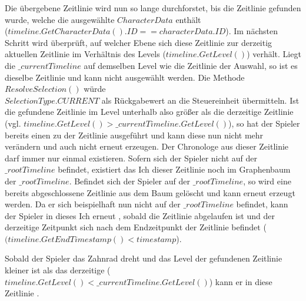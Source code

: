 Die übergebene Zeitlinie wird nun so lange durchforstet, bis die Zeitlinie gefunden wurde, welche die ausgewählte $CharacterData$ enthält 
 \\($timeline.GetCharacterData().ID == characterData.ID$). Im nächsten Schritt wird überprüft, auf welcher Ebene sich diese Zeitlinie zur derzeitig aktuellen Zeitlinie im Verhältnis des Levels ($timeline.GetLevel()$) verhält. Liegt die $\_currentTimeline$ auf demselben Level wie die Zeitlinie der Auswahl, so ist es dieselbe Zeitlinie und kann nicht ausgewählt werden. Die Methode $ResolveSelection()$ würde \\$SelectionType.CURRENT$ als Rückgabewert an die Steuereinheit übermitteln. Ist die gefundene Zeitlinie im Level unterhalb also größer als die derzeitige Zeitlinie (vgl. $timeline.GetLevel() > \_currentTimeline.GetLevel()$), so hat der Spieler bereits einen  zu der Zeitlinie ausgeführt und kann diese nun nicht mehr verändern und auch nicht erneut erzeugen. Der Chronologe aus dieser Zeitlinie darf immer nur einmal existieren. Sofern sich der Spieler nicht auf der $\_rootTimeline$ befindet, existiert das Ich dieser Zeitlinie noch im Graphenbaum der $\_rootTimeline$. Befindet sich der Spieler auf der $\_rootTimeline$, so wird eine bereits abgeschlossene Zeitlinie aus dem Baum gelöscht und kann erneut erzeugt werden. Da er sich beispielhaft nun nicht auf der $\_rootTimeline$ befindet, kann der Spieler in dieses Ich erneut , sobald die Zeitlinie abgelaufen ist und der derzeitige Zeitpunkt sich nach dem Endzeitpunkt der Zeitlinie befindet ($(timeline.GetEndTimestamp() < timestamp$).

Sobald der Spieler das Zahnrad dreht und das Level der gefundenen Zeitlinie kleiner ist als das derzeitige ($timeline.GetLevel() < \_currentTimeline.GetLevel()$) kann er in diese Zeitlinie .

